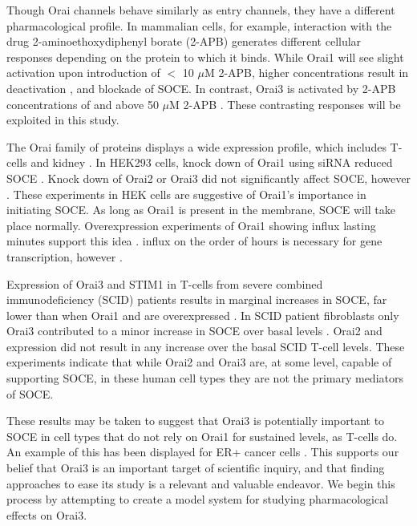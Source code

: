 Though Orai channels behave similarly as \Ca{} entry channels, they have a different pharmacological profile. In mammalian cells, for example, interaction with the drug 2-aminoethoxydiphenyl borate (2-APB) generates different cellular responses depending on the protein to which it binds. 
While Orai1 will see slight activation upon introduction of $<$ 10 $\mu$M 2-APB, %
higher concentrations result in deactivation \citep{Feske2006,Goto2010,Prakriya2006,Zhang2008a}, and blockade of SOCE. In contrast, Orai3 is activated by 2-APB concentrations of and above 50 $\mu$M 2-APB \citep{Goto2010,Zhang2008a}. These contrasting responses will be exploited in this study.

The Orai family of proteins displays a wide expression profile, which includes T-cells and kidney \citep{Gwack2007}. In HEK293 cells, knock down of Orai1 using siRNA reduced SOCE \citep{Gwack2007}. Knock down of Orai2 or Orai3 did not significantly affect SOCE, however \citep{Gwack2007}. These experiments in HEK cells are suggestive of Orai1's importance in initiating SOCE. As long as Orai1 is present in the membrane, SOCE will take place normally. Overexpression experiments of Orai1 showing \Ca{} influx lasting minutes support this idea \citep{Gwack2007,Zhang2008a}. \Ca{} influx on the order of hours is necessary for gene transcription, however \citep{Baksh2000}. 

Expression of  Orai3 and STIM1 in T-cells from severe combined immunodeficiency (SCID) patients results in marginal increases in SOCE, far lower than when Orai1 and \stim{} are overexpressed \citep{Gwack2007}. 
In SCID patient fibroblasts only Orai3 contributed to a minor increase in SOCE over basal levels \citep{Gwack2007}. 
Orai2 and \stim{} expression did not result in any increase over the basal SCID T-cell levels. These experiments indicate that while Orai2 and Orai3 are, at some level, capable of supporting SOCE, in these human cell types they are not the primary mediators of SOCE. 

These results may be taken to suggest that Orai3 is potentially important to SOCE in cell types that do not rely on Orai1 for sustained \Ca{} levels, as T-cells do. An example of this has been displayed for ER+ cancer cells \citep{Motiani2010}. This supports our belief that Orai3 is an important target of scientific inquiry, and that finding approaches to ease its study is a relevant and valuable endeavor. We begin this process by attempting to create a model system for studying pharmacological effects on Orai3.




